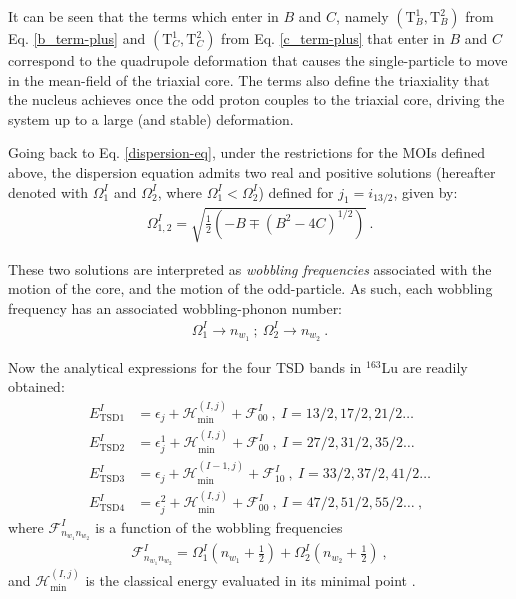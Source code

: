 \documentclass[11pt]{article}
\begin{document}
It can be seen that the terms which enter in $B$ and $C$, namely $(\text{T}_B^1,\text{T}_B^2)$ from Eq. \ref{b_term-plus} and $(\text{T}_C^1,\text{T}_C^2)$ from Eq. \ref{c_term-plus} that enter in $B$ and $C$ correspond to the quadrupole deformation that causes the single-particle to move in the mean-field of the triaxial core. The terms also define the triaxiality that the nucleus achieves once the odd proton couples to the triaxial core, driving the system up to a large (and stable) deformation.

Going back to Eq. \ref{dispersion-eq}, under the restrictions for the MOIs defined above, the dispersion equation admits two real and positive solutions (hereafter denoted with $\Omega_1^I$ and $\Omega_2^I$, where $\Omega_1^I<\Omega_2^I$) defined for $j_1=i_{13/2}$, given by:
\begin{align}
    \Omega_{1,2}^I=\sqrt{\frac{1}{2}\left(-B\mp(B^2-4C)^{1/2}\right)}\ .
    \label{wobbling-frequencies}
\end{align}

These two solutions are interpreted as \emph{wobbling frequencies} associated with the motion of the core, and the motion of the odd-particle. As such, each wobbling frequency has an associated wobbling-phonon number:
\begin{align}
    \Omega_1^I \to n_{w_1}\ ;\ \Omega_2^I \to n_{w_2}\ .
\end{align}


Now  the analytical expressions for the four TSD bands in $^{163}$Lu are readily obtained:
\begin{align}
    E_\text{TSD1}^I&=\epsilon_j+\mathcal{H}_\text{min}^{(I,j)}+\mathcal{F}_{00}^I\ ,\ I=13/2,17/2,21/2\dots \nonumber \\
    E_\text{TSD2}^I&=\epsilon_j^1+\mathcal{H}_\text{min}^{(I,j)}+\mathcal{F}_{00}^I\ ,\ I=27/2,31/2,35/2\dots \nonumber \\
    E_\text{TSD3}^I&=\epsilon_j+\mathcal{H}_\text{min}^{(I-1,j)}+\mathcal{F}_{10}^I\ ,\ I=33/2,37/2,41/2\dots \nonumber \\
    E_\text{TSD4}^I&=\epsilon_j^2+\mathcal{H}_\text{min}^{(I,j)}+\mathcal{F}_{00}^I\ ,\ I=47/2,51/2,55/2\dots\ ,
    \label{wobbling_energies}
\end{align}
where $\mathcal{F}_{n_{w_1}n_{w_2}}^I$ is a function of the wobbling frequencies
\begin{align}
    \mathcal{F}_{n_{w_1}n_{w_2}}^I=\Omega_1^I\left(n_{w_1}+\frac{1}{2}\right)+\Omega_2^I\left(n_{w_2}+\frac{1}{2}\right)\ ,
    \label{f-term}
\end{align}
and $\mathcal{H}_\text{min}^{(I,j)}$ is the classical energy evaluated in its minimal point .
\end{document}
